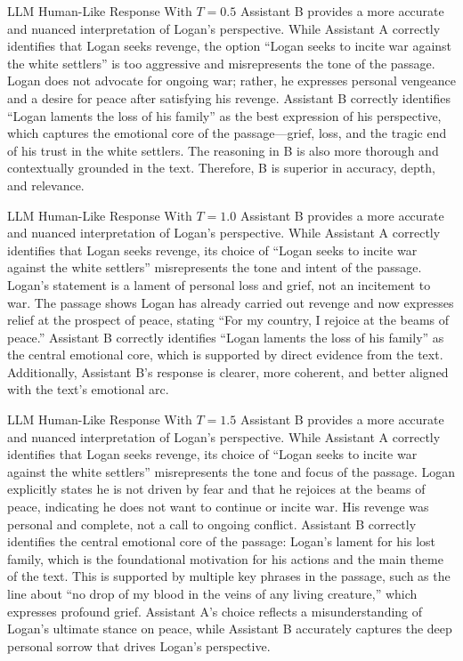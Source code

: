 \documentclass[11pt]{article}
\begin{document}
\begin{responsebox}{LLM Human-Like Response With $T=0.5$}
Assistant B provides a more accurate and nuanced interpretation of Logan's perspective. While
Assistant A correctly identifies that Logan seeks revenge, the option ``Logan seeks to incite war
against the white settlers'' is too aggressive and misrepresents the tone of the passage. Logan does
not advocate for ongoing war; rather, he expresses personal vengeance and a desire for peace after
satisfying his revenge. Assistant B correctly identifies ``Logan laments the loss of his family'' as
the best expression of his perspective, which captures the emotional core of the passage---grief,
loss, and the tragic end of his trust in the white settlers. The reasoning in B is also more
thorough and contextually grounded in the text. Therefore, B is superior in accuracy, depth, and
relevance.
\end{responsebox}

\begin{responsebox}{LLM Human-Like Response With $T=1.0$}
Assistant B provides a more accurate and nuanced interpretation of Logan's perspective. While
Assistant A correctly identifies that Logan seeks revenge, its choice of ``Logan seeks to incite war
against the white settlers'' misrepresents the tone and intent of the passage. Logan's statement is a
lament of personal loss and grief, not an incitement to war. The passage shows Logan has already
carried out revenge and now expresses relief at the prospect of peace, stating ``For my country, I
rejoice at the beams of peace.'' Assistant B correctly identifies ``Logan laments the loss of his
family'' as the central emotional core, which is supported by direct evidence from the text.
Additionally, Assistant B's response is clearer, more coherent, and better aligned with the text's
emotional arc.
\end{responsebox}

\begin{responsebox}{LLM Human-Like Response With $T=1.5$}
Assistant B provides a more accurate and nuanced interpretation of Logan's perspective. While
Assistant A correctly identifies that Logan seeks revenge, its choice of ``Logan seeks to incite war
against the white settlers'' misrepresents the tone and focus of the passage. Logan explicitly states
he is not driven by fear and that he rejoices at the beams of peace, indicating he does not want to
continue or incite war. His revenge was personal and complete, not a call to ongoing conflict.
Assistant B correctly identifies the central emotional core of the passage: Logan's lament for his
lost family, which is the foundational motivation for his actions and the main theme of the text.
This is supported by multiple key phrases in the passage, such as the line about ``no drop of my
blood in the veins of any living creature,'' which expresses profound grief. Assistant A's choice
reflects a misunderstanding of Logan's ultimate stance on peace, while Assistant B accurately
captures the deep personal sorrow that drives Logan's perspective.
\end{responsebox}
\end{document}

